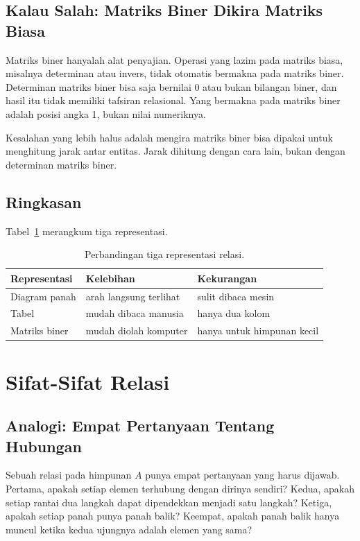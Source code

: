 \documentclass[11pt,a4paper]{article}
\begin{document}
\subsection{Kalau Salah: Matriks Biner Dikira Matriks Biasa}

Matriks biner hanyalah alat penyajian. Operasi yang lazim pada matriks biasa, misalnya determinan atau invers, tidak otomatis bermakna pada matriks biner. Determinan matriks biner bisa saja bernilai 0 atau bukan bilangan biner, dan hasil itu tidak memiliki tafsiran relasional. Yang bermakna pada matriks biner adalah posisi angka 1, bukan nilai numeriknya.

Kesalahan yang lebih halus adalah mengira matriks biner bisa dipakai untuk menghitung jarak antar entitas. Jarak dihitung dengan cara lain, bukan dengan determinan matriks biner.

\subsection{Ringkasan}

Tabel~\ref{tab:representasi} merangkum tiga representasi.

\begin{table}[H]
	\centering
	\caption{Perbandingan tiga representasi relasi.}
	\label{tab:representasi}
	\small
	\begin{tabularx}{\textwidth}{l X X}
		\toprule
		Representasi  & Kelebihan              & Kekurangan                 \\
		\midrule
		Diagram panah & arah langsung terlihat & sulit dibaca mesin         \\
		Tabel         & mudah dibaca manusia   & hanya dua kolom            \\
		Matriks biner & mudah diolah komputer  & hanya untuk himpunan kecil \\
		\bottomrule
	\end{tabularx}
\end{table}

\section{Sifat-Sifat Relasi}

\subsection{Analogi: Empat Pertanyaan Tentang Hubungan}

Sebuah relasi pada himpunan $A$ punya empat pertanyaan yang harus dijawab. Pertama, apakah setiap elemen terhubung dengan dirinya sendiri? Kedua, apakah setiap rantai dua langkah dapat dipendekkan menjadi satu langkah? Ketiga, apakah setiap panah punya panah balik? Keempat, apakah panah balik hanya muncul ketika kedua ujungnya adalah elemen yang sama?
\end{document}
